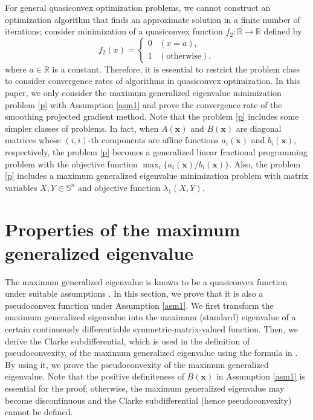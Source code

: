 \documentclass[sn-mathphys,Numbered]{sn-jnl}%
\theoremstyle{thmstyleone}%
\theoremstyle{thmstyletwo}%
\theoremstyle{thmstylethree}%
\newcommand{\e}[1]{\begin{equation}#1\end{equation}}
\begin{document}
For general quasiconvex optimization problems, we cannot construct an optimization algorithm that finds an approximate solution in a finite number of iterations; consider minimization of a quasiconvex function $f_2:\mathbb{R}\to\mathbb{R}$ defined by
\e{
f_2(x)=\begin{cases}
0 & (x=a),\\
1 & (\mathrm{otherwise}),
\end{cases}
}
where $a\in\mathbb{R}$ is a constant. Therefore, it is essential to restrict the problem class to consider convergence rates of algorithms in quasiconvex optimization. In this paper, we only consider the maximum generalized eigenvalue minimization problem \eqref{p} with Assumption \ref{asm1} and prove the convergence rate of the smoothing projected gradient method. Note that the problem \eqref{p} includes some simpler classes of problems. In fact, when $A(\bm{x})$ and $B(\bm{x})$ are diagonal matrices whose $(i,i)$-th components are affine functions $a_i(\bm{x})$ and $b_i(\bm{x})$, respectively, the problem \eqref{p} becomes a generalized linear fractional programming problem with the objective function $\max_i \{a_i(\bm{x})/b_i(\bm{x})\}$. Also, the problem \eqref{p} includes a maximum generalized eigenvalue minimization problem with matrix variables $X,Y\in\mathbb{S}^n$ and objective function $\lambda_1 (X,Y)$.

\section{Properties of the maximum generalized eigenvalue}

The maximum generalized eigenvalue is known to be a quasiconvex function under suitable assumptions \cite{achtziger07siam}. In this section, we prove that it is also a pseudoconvex function under Assumption \ref{asm1}. We first transform the maximum generalized eigenvalue into the maximum (standard) eigenvalue of a certain continuously differentiable symmetric-matrix-valued function. Then, we derive the Clarke subdifferential, which is used in the definition of pseudoconvexity, of the maximum generalized eigenvalue using the formula in \cite{overton92}. By using it, we prove the pseudoconvexity of the maximum generalized eigenvalue. Note that the positive definiteness of $B(\bm{x})$ in Assumption \ref{asm1} is essential for the proof; otherwise, the maximum generalized eigenvalue may become discontinuous \cite{achtziger07siam} and the Clarke subdifferential (hence pseudoconvexity) cannot be defined. 
\end{document}
